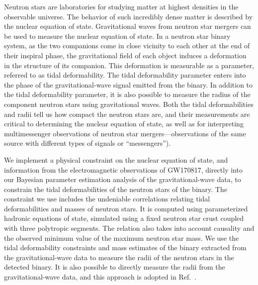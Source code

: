 Neutron stars are laboratories for studying matter at highest densities in the observable universe. The behavior of such incredibly dense matter is described by the nuclear equation of state. Gravitational waves from neutron star mergers can be used to measure the nuclear equation of state. In a neutron star binary system, as the two companions come in close vicinity to each other at the end of their inspiral phase, the gravitational field of each object induces a deformation in the structure of its companion. This deformation is measurable as a parameter, referred to as tidal deformability. The tidal deformability parameter enters into the phase of the gravitational-wave signal emitted from the binary. In addition to the tidal deformability parameter, it is also possible to measure the radius of the component neutron stars using gravitational waves. Both the tidal deformabilities and radii tell us how compact the neutron stars are, and their measurements are critical to determining the nuclear equation of state, as well as for interpreting multimessenger observations of neutron star mergers---observations of the same source with different types of signals or ``messengers'').

We implement a physical constraint on the nuclear equation of state, and information from the electromagnetic observations of GW170817, directly into our Bayesian parameter estimation analysis of the gravitational-wave data, to constrain the tidal deformabilities of the neutron stars of the binary. The constraint we use includes the undeniable correlations relating tidal deformabilities and masses of neutron stars. It is computed using parameterized hadronic equations of state, simulated using a fixed neutron star crust coupled with three polytropic segments. The relation also takes into account causality and the observed minimum value of the maximum neutron star mass. We use the tidal deformability constraints and mass estimates of the binary extracted from the gravitational-wave data to measure the radii of the neutron stars in the detected binary. It is also possible to directly measure the radii from the gravitational-wave data, and this approach is adopted in Ref.~\cite{capano_stringent_2020}.

